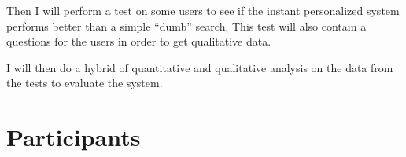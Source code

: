   Then I will perform a test on some users to see if the instant personalized system performs better than a simple ``dumb'' search. This test will also contain a questions for the users in order to get qualitative data.

  I will then do a hybrid of quantitative and qualitative analysis on the data from the tests to evaluate the system.



  \section*{Participants}

